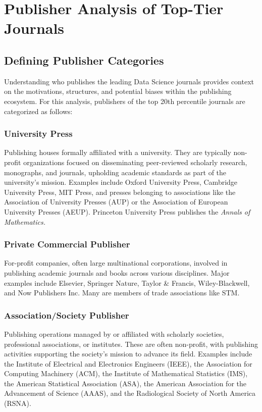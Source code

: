 \documentclass[../main.tex]{subfiles}
\begin{document}
\section{Publisher Analysis of Top-Tier Journals}

\subsection{Defining Publisher Categories}
\vspace{0.2cm}
\noindent
Understanding who publishes the leading Data Science journals provides context on the motivations, structures, and potential biases within the publishing ecosystem. For this analysis, publishers of the top 20th percentile journals are categorized as follows:


\subsubsection{University Press}
\vspace{0.2cm}
\noindent
Publishing houses formally affiliated with a university. They are typically non-profit organizations focused on disseminating peer-reviewed scholarly research, monographs, and journals, upholding academic standards as part of the university's mission. Examples include Oxford University Press, Cambridge University Press, MIT Press, and presses belonging to associations like the Association of University Presses (AUP) or the Association of European University Presses (AEUP). Princeton University Press publishes the \textit{Annals of Mathematics.}

\subsubsection{Private Commercial Publisher}
\vspace{0.2cm}
\noindent
For-profit companies, often large multinational corporations, involved in publishing academic journals and books across various disciplines. Major examples include Elsevier, Springer Nature, Taylor \& Francis, Wiley-Blackwell, and Now Publishers Inc. Many are members of trade associations like STM.

\subsubsection{Association/Society Publisher}
\vspace{0.2cm}
\noindent
Publishing operations managed by or affiliated with scholarly societies, professional associations, or institutes. These are often non-profit, with publishing activities supporting the society's mission to advance its field. Examples include the Institute of Electrical and Electronics Engineers (IEEE), the Association for Computing Machinery (ACM), the Institute of Mathematical Statistics (IMS), the American Statistical Association (ASA), the American Association for the Advancement of Science (AAAS), and the Radiological Society of North America (RSNA).
\end{document}

